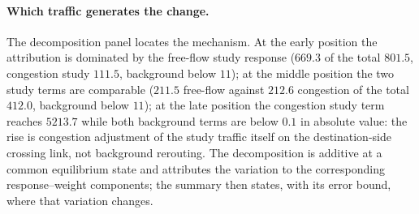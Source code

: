 \paragraph{Which traffic generates the change.}
The decomposition panel locates the mechanism. At the early position
the attribution is dominated by the free-flow study response ($669.3$
of the total $801.5$, congestion study $111.5$, background below $11$);
at the middle position the two study terms are comparable ($211.5$
free-flow against $212.6$ congestion of the total $412.0$, background
below $11$); at the late position the congestion study term reaches
$5213.7$ while both background terms are below $0.1$ in absolute value:
the rise is congestion adjustment of the study traffic itself on the
destination-side crossing link, not background rerouting. The
decomposition is additive at a common equilibrium state and attributes
the variation to the corresponding response--weight components; the
summary then states, with its error bound, where that variation
changes.

